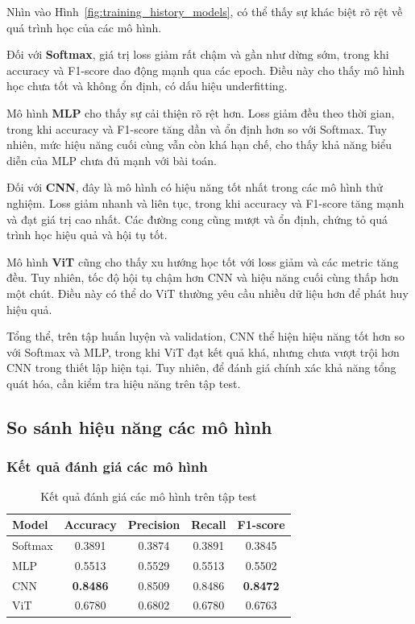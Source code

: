 Nhìn vào Hình~\ref{fig:training_history_models}, có thể thấy sự khác biệt rõ rệt về quá trình học của các mô hình.

Đối với \textbf{Softmax}, giá trị loss giảm rất chậm và gần như dừng sớm, trong khi accuracy và F1-score dao động mạnh qua các epoch. Điều này cho thấy mô hình học chưa tốt và không ổn định, có dấu hiệu underfitting.

Mô hình \textbf{MLP} cho thấy sự cải thiện rõ rệt hơn. Loss giảm đều theo thời gian, trong khi accuracy và F1-score tăng dần và ổn định hơn so với Softmax. Tuy nhiên, mức hiệu năng cuối cùng vẫn còn khá hạn chế, cho thấy khả năng biểu diễn của MLP chưa đủ mạnh với bài toán.

Đối với \textbf{CNN}, đây là mô hình có hiệu năng tốt nhất trong các mô hình thử nghiệm. Loss giảm nhanh và liên tục, trong khi accuracy và F1-score tăng mạnh và đạt giá trị cao nhất. Các đường cong cũng mượt và ổn định, chứng tỏ quá trình học hiệu quả và hội tụ tốt.

Mô hình \textbf{ViT} cũng cho thấy xu hướng học tốt với loss giảm và các metric tăng đều. Tuy nhiên, tốc độ hội tụ chậm hơn CNN và hiệu năng cuối cùng thấp hơn một chút. Điều này có thể do ViT thường yêu cầu nhiều dữ liệu hơn để phát huy hiệu quả.

Tổng thể, trên tập huấn luyện và validation, CNN thể hiện hiệu năng tốt hơn so với Softmax và MLP, trong khi ViT đạt kết quả khá, nhưng chưa vượt trội hơn CNN trong thiết lập hiện tại. Tuy nhiên, để đánh giá chính xác khả năng tổng quát hóa, cần kiểm tra hiệu năng trên tập test.

\subsection{So sánh hiệu năng các mô hình}

\subsubsection{Kết quả đánh giá các mô hình}

\begin{table}[H]
    \centering
    \begin{tabular}{lcccc}
        \hline
        \textbf{Model} & \textbf{Accuracy} & \textbf{Precision} & \textbf{Recall} & \textbf{F1-score} \\
        \hline
        Softmax & 0.3891 & 0.3874 & 0.3891 & 0.3845 \\
        MLP     & 0.5513 & 0.5529 & 0.5513 & 0.5502 \\
        CNN     & \textbf{0.8486} & 0.8509 & 0.8486 & \textbf{0.8472} \\
        ViT     & 0.6780 & 0.6802 & 0.6780 & 0.6763 \\
        \hline
    \end{tabular}
    \caption{Kết quả đánh giá các mô hình trên tập test}
\end{table}

